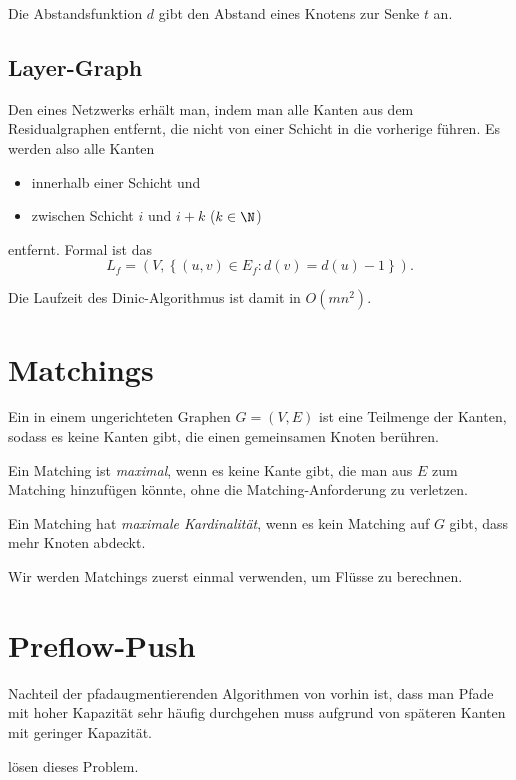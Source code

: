 Die Abstandsfunktion \( d \) gibt den Abstand eines Knotens zur Senke \( t \) an.

\subsection{Layer-Graph}

Den  eines Netzwerks erhält man, indem man alle Kanten aus dem Residualgraphen entfernt, die nicht von einer Schicht in die vorherige führen. Es werden also alle Kanten
\begin{itemize}
  \item innerhalb einer Schicht und
  \item zwischen Schicht \( i \) und \( i + k \) (\( k \in \N \))
\end{itemize}
entfernt. Formal ist das
\begin{equation*}
  L_f = (V, \left \{ (u,v) \in E_f : d(v) = d(u) - 1 \right \})\text{.}
\end{equation*}

Die Laufzeit des Dinic-Algorithmus ist damit in \( O(mn^2) \).

\section{Matchings}

Ein  in einem ungerichteten Graphen \( G = (V, E) \) ist eine Teilmenge der Kanten, sodass es keine Kanten gibt, die einen gemeinsamen Knoten berühren.

Ein Matching ist \emph{maximal}, wenn es keine Kante gibt, die man aus \( E \) zum Matching hinzufügen könnte, ohne die Matching-Anforderung zu verletzen.

Ein Matching hat \emph{maximale Kardinalität}, wenn es kein Matching auf \( G \) gibt, dass mehr Knoten abdeckt.

Wir werden Matchings zuerst einmal verwenden, um Flüsse zu berechnen.

\section{Preflow-Push}

Nachteil der pfadaugmentierenden Algorithmen von vorhin ist, dass man Pfade mit hoher Kapazität sehr häufig durchgehen muss aufgrund von späteren Kanten mit geringer Kapazität.

 lösen dieses Problem.

